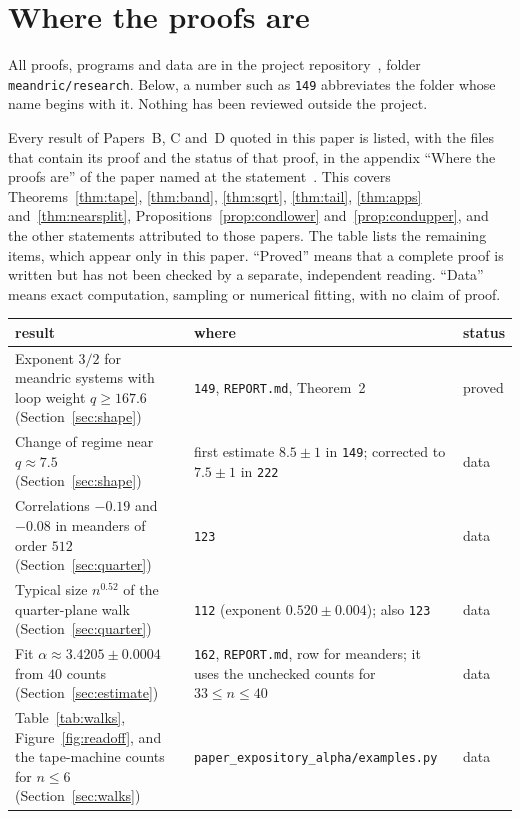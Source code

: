 \section{Where the proofs are}\label{app:repo}

All proofs, programs and data are in the project repository~\cite{Repo}, folder
\texttt{meandric/research}. Below, a number such as \texttt{149} abbreviates the folder whose name
begins with it. Nothing has been reviewed outside the project.

Every result of Papers~B, C and~D quoted in this paper is listed, with the files that contain its
proof and the status of that proof, in the appendix ``Where the proofs are'' of the paper named at
the statement~\cite{PaperB,PaperC,PaperD}. This covers Theorems~\ref{thm:tape}, \ref{thm:band},
\ref{thm:sqrt}, \ref{thm:tail}, \ref{thm:apps} and~\ref{thm:nearsplit},
Propositions~\ref{prop:condlower} and~\ref{prop:condupper}, and the other statements attributed to
those papers. The table lists the remaining items, which appear only in this paper. ``Proved''
means that a complete proof is written but has not been checked by a separate, independent
reading. ``Data'' means exact computation, sampling or numerical fitting, with no claim of proof.

\begin{center}
\small
\renewcommand{\arraystretch}{1.1}
\begin{tabular}{>{\raggedright\arraybackslash}p{}>{\raggedright\arraybackslash}p{}>{\raggedright\arraybackslash}p{}}
\toprule
result & where & status\\
\midrule
Exponent $3/2$ for meandric systems with loop weight $q\ge167.6$ (Section~\ref{sec:shape}) &
\texttt{149}, \texttt{REPORT.md}, Theorem~2 & proved\\
Change of regime near $q\approx7.5$ (Section~\ref{sec:shape}) & first estimate $8.5\pm1$ in
\texttt{149}; corrected to $7.5\pm1$ in \texttt{222} & data\\
Correlations $-0.19$ and $-0.08$ in meanders of order $512$ (Section~\ref{sec:quarter}) &
\texttt{123} & data\\
Typical size $n^{0.52}$ of the quarter-plane walk (Section~\ref{sec:quarter}) & \texttt{112}
(exponent $0.520\pm0.004$); also \texttt{123} & data\\
Fit $\alpha\approx3.4205\pm0.0004$ from $40$ counts (Section~\ref{sec:estimate}) & \texttt{162},
\texttt{REPORT.md}, row for meanders; it uses the unchecked counts for $33\le n\le40$ & data\\
Table~\ref{tab:walks}, Figure~\ref{fig:readoff}, and the tape-machine counts for $n\le6$
(Section~\ref{sec:walks}) & \texttt{paper\_expository\_alpha/\allowbreak examples.py} & data\\
\bottomrule
\end{tabular}
\end{center}
